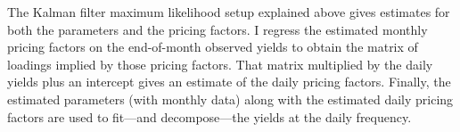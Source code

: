 {The Kalman filter maximum likelihood setup explained above gives estimates for both the parameters and the pricing factors.
I regress the estimated monthly pricing factors on the end-of-month observed yields to obtain the matrix of loadings implied by those pricing factors.
That matrix multiplied by the daily yields plus an intercept gives an estimate of the daily pricing factors.
Finally, the estimated parameters (with monthly data) along with the estimated daily pricing factors are used to fit---and decompose---the yields at the daily frequency.

%


}
